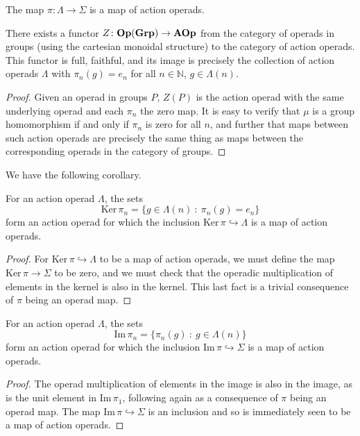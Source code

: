 \begin{prop}
The map $\pi \colon \Lambda \rightarrow \Sigma$ is a map of action operads.
\end{prop}


\begin{prop}\label{Z}
There exists a functor $Z \colon  \mathbf{Op}(\mathbf{Grp}) \rightarrow \mathbf{AOp}$ from the category of operads in groups (using the cartesian monoidal structure) to the category of action operads. This functor is full, faithful, and its image is precisely the collection of action operads $\Lambda$ with $\pi_{n}(g) = e_{n}$ for all $n \in \mathbb{N}$, $g \in \Lambda(n)$.
\end{prop}
\begin{proof}
Given an operad in groups $P$, $Z(P)$ is the action operad with the same underlying operad and each $\pi_{n}$ the zero map. It is easy to verify that $\mu$ is a group homomorphism if and only if $\pi_{n}$ is zero for all $n$, and further that maps between such action operads are precisely the same thing as maps between the corresponding operads in the category of groups.
\end{proof}

We have the following corollary.
\begin{cor}\label{corZ}
For an action operad $\Lambda$, the sets
  \[
    \mathrm{Ker}\,\pi_n = \{g \in \Lambda(n)~\colon~\pi_{n}(g) = e_{n} \}
  \]
form an action operad for which the inclusion $\mathrm{Ker}\,\pi \hookrightarrow \Lambda$ is a map of action operads.
\end{cor}
\begin{proof}
For $\textrm{Ker}\,\pi \hookrightarrow \Lambda$ to be a map of action operads, we must define the map $\textrm{Ker}\,\pi \rightarrow \Sigma$ to be zero,  and we must check that the operadic multiplication of elements in the kernel is also in the kernel. This last fact is a trivial consequence of $\pi$ being an operad map.
\end{proof}
\begin{cor}\label{image}
For an action operad $\Lambda$, the sets
  \[
    \mathrm{Im}\,\pi_n = \{\pi_n(g)~\colon~g \in \Lambda(n)\}
  \]
form an action operad for which the inclusion $\mathrm{Im}\,\pi \hookrightarrow \Sigma$ is a map of action operads.
\end{cor}
\begin{proof}
The operad multiplication of elements in the image is also in the image, as is the unit element in $\mathrm{Im}\,\pi_1$, following again as a consequence of $\pi$ being an operad map. The map $\mathrm{Im}\,\pi \hookrightarrow \Sigma$ is an inclusion and so is immediately seen to be a map of action operads.
\end{proof}

